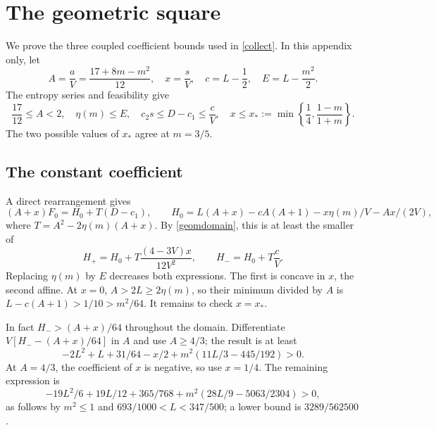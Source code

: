 \documentclass[11pt]{article}
\numberwithin{equation}{section}
\begin{document}
\appendix
\section{The geometric square}
We prove the three coupled coefficient bounds used in \eqref{collect}. In this appendix only, let
\[
 A=\frac aV=\frac{17+8m-m^2}{12},\quad
 x=\frac sV,\quad c=L-\frac12,\quad E=L-\frac{m^2}{2}.
\]
The entropy series and feasibility give
\begin{equation}\label{geomdomain}
 \frac{17}{12}\le A<2,\quad \eta(m)\le E,\quad
 c_2s\le D-c_1\le\frac cV,\quad
 x\le x_*:=\min\left\{\frac14,\frac{1-m}{1+m}\right\}.
\end{equation}
The two possible values of $x_*$ agree at $m=3/5$.

\subsection*{The constant coefficient}
A direct rearrangement gives
\[
 (A+x)F_0=H_0+T(D-c_1),\qquad
 H_0=L(A+x)-cA(A+1)-x\eta(m)/V-Ax/(2V),
\]
where $T=A^2-2\eta(m)(A+x)$. By \eqref{geomdomain}, this is at least the smaller of
\[
 H_+=H_0+T\frac{(4-3V)x}{12V^2},\qquad H_-=H_0+T\frac cV.
\]
Replacing $\eta(m)$ by $E$ decreases both expressions. The first is concave in $x$, the second affine. At $x=0$, $A>2L\ge2\eta(m)$, so their minimum divided by $A$ is $L-c(A+1)>1/10>m^2/64$. It remains to check $x=x_*$.

In fact $H_->(A+x)/64$ throughout the domain. Differentiate $V[H_--(A+x)/64]$ in $A$ and use $A\ge4/3$; the result is at least
\[
 -2L^2+L+31/64-x/2
 +m^2(11L/3-445/192)>0.
\]
At $A=4/3$, the coefficient of $x$ is negative, so use $x=1/4$. The remaining expression is
\[
 -19L^2/6+19L/12+365/768
 +m^2(28L/9-5063/2304)>0,
\]
as follows by $m^2\le1$ and $693/1000<L<347/500$; a lower bound is $3289/562500$.
\end{document}
